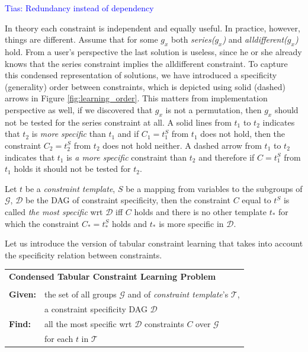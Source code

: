 \documentclass{ecai}
\newcommand{\tias}[1]{\textcolor{blue}{{\sc Tias:} #1}\xspace}
\newcommand{\constraints}{\ensuremath{\mathcal{T}}\xspace}
\newcommand{\format}[1]{\textit{#1}\xspace}
\newcommand{\template}{\format{constraint template}}
\newcommand{\dependencies}{\ensuremath{\mathcal{D}}\xspace}
\newcommand{\groups}{\ensuremath{\mathcal{G}}\xspace}
\begin{document}
\tias{Redundancy instead of dependency}

  In theory each constraint is independent and equally useful. In practice, however, things are different. Assume that for some $g_x$ both \textit{series($g_x$)} and \textit{alldifferent($g_x$)} hold. From a user's perspective the last solution is useless, since he or she already knows that the series constraint implies the alldifferent constraint. To capture this condensed representation \cite{condensed} of solutions, we have introduced a specificity (generality) order between constraints, which is depicted using solid (dashed) arrows in Figure \ref{fig:learning_order}. This matters from implementation perspective as well, if we discovered that $g_x$ is not a permutation, then $g_x$ should not be tested for the series constraint at all. A solid lines from $t_1$ to $t_2$ indicates that $t_2$ is \textit{more specific} than $t_1$ and if $C_1=t_1^S$ from $t_1$ does not hold, then the constraint $C_2=t_2^S$ from $t_2$ does not hold neither. A dashed arrow from $t_1$ to $t_2$ indicates that $t_1$ is \textit{a more specific} constraint than $t_2$ and therefore if $C=t_1^S$ from $t_1$ holds it should not be tested for $t_2$.


Let $t$ be a \template, $S$ be a mapping from variables to the subgroups of \groups, \dependencies be the DAG of constraint specificity, then the constraint $C$ equal to $t^S$ is called \textit{the most specific} wrt \dependencies iff $C$ holds and there is no other template $t_{*}$ for which the constraint $C_{*}=t_{*}^S$ holds and $t_{*}$ is more specific in \dependencies.


Let us introduce the version of tabular constraint learning that takes into account the specificity relation between constraints.

\begin{minipage}[c]{14em}
  \vspace{5pt}
  \begin{tabular}{ll}
    \multicolumn{2}{l}{{\textbf{Condensed Tabular Constraint Learning Problem}}}\\
    \vspace{-4pt}
    &\\
    \textbf{Given:}& the set of all groups $\groups$ and of \template's $\constraints$,\\
    & a constraint specificity DAG \dependencies \\
    \textbf{Find:}& all the most specific wrt \dependencies constraints $C$ over \groups\\
    & for each $t$ in \constraints \\
  \end{tabular}
  \vspace{6pt}
\end{minipage}
\end{document}
